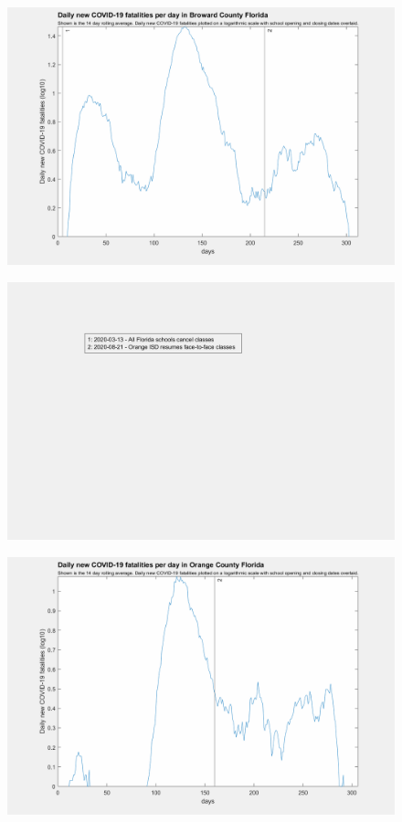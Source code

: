 \documentclass[]{article}
\begin{document}
\begin{figure}[!h]
	\includegraphics[width=\linewidth]{images/broward_fatalities_school_log.png}
	\caption{}
	\label{fig:images/broward_fatalities_school_logLabel}
\end{figure}

\begin{figure}[!h]
	\includegraphics[width=\linewidth]{legends/orange_school_legend.png}
	\caption{}
	\label{fig:legends/orange_school_legendLabel}
\end{figure}

\begin{figure}[!h]
	\includegraphics[width=\linewidth]{images/orange_fatalities_school_log.png}
	\caption{}
	\label{fig:images/orange_fatalities_school_logLabel}
\end{figure}
\end{document}
